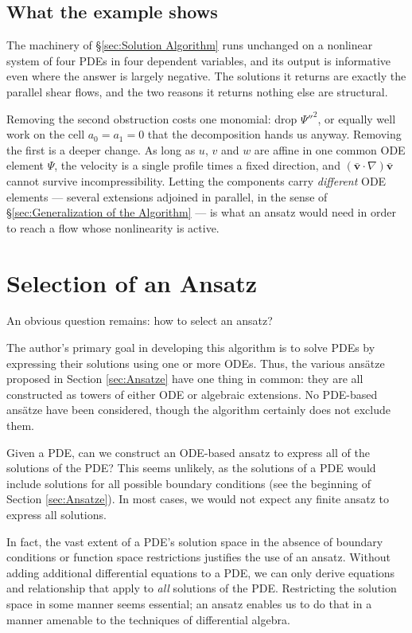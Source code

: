 \documentclass{article}
\theoremstyle{definition}
\theoremstyle{plain}
\begin{document}
\begin{nsexample}
\subsection{What the example shows}

The machinery of \S\ref{sec:Solution Algorithm} runs unchanged on a nonlinear
system of four PDEs in four dependent variables, and its output is informative
even where the answer is largely negative.  The solutions it returns are
exactly the parallel shear flows, and the two reasons it returns nothing else
are structural.

Removing the second obstruction costs one monomial: drop $\Psi''^2$, or equally
well work on the cell $a_0 = a_1 = 0$ that the decomposition hands us anyway.
Removing the first is a deeper change.  As long as $u$, $v$ and $w$ are affine
in one common ODE element $\Psi$, the velocity is a single profile times a
fixed direction, and $(\mathbf{\bar{v}}\cdot\nabla)\mathbf{\bar{v}}$ cannot
survive incompressibility.  Letting the components carry {\it different} ODE
elements --- several extensions adjoined in parallel, in the sense of
\S\ref{sec:Generalization of the Algorithm} --- is what an ansatz would need in
order to reach a flow whose nonlinearity is active.

\end{nsexample}

\section{Selection of an Ansatz}
\label{sec:Selection of an Ansatz}

An obvious question remains: how to select an ansatz?

The author's primary goal in developing this algorithm is to solve PDEs by expressing their solutions
using one or more ODEs.  Thus, the various ans\"atze proposed in Section \ref{sec:Ansatze} have
one thing in common: they are all constructed as towers of either ODE or algebraic extensions.
No PDE-based ans\"atze have been considered, though the algorithm certainly does not exclude them.

Given a PDE, can we construct an ODE-based ansatz to express all of the solutions of the PDE?
This seems unlikely, as the solutions of a PDE would include solutions for all possible
boundary conditions (see the beginning of Section \ref{sec:Ansatze}).
In most cases, we would not expect any finite ansatz to express all solutions.

In fact, the vast extent of a PDE's solution space in the
absence of boundary conditions or function space restrictions
justifies the use of an ansatz.  Without adding additional differential equations to a PDE,
we can only derive equations and relationship that apply to {\it all} solutions of the PDE.
Restricting the solution space in
some manner seems essential; an ansatz enables us to do that in a manner
amenable to the techniques of differential algebra.
\end{document}
